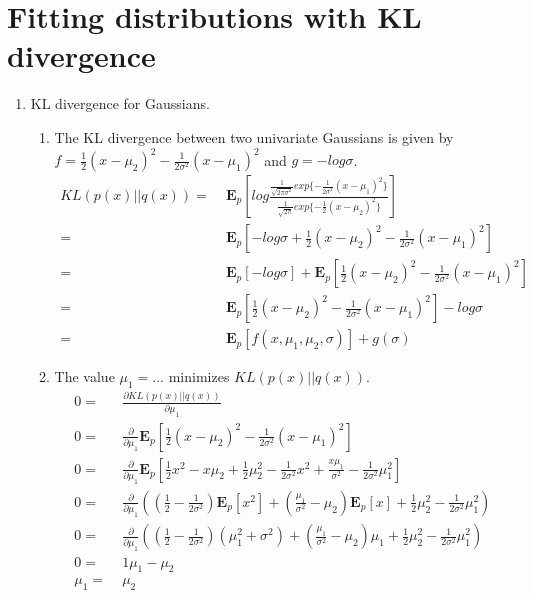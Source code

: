 \section{Fitting distributions with KL divergence}
\begin{enumerate}
\item KL divergence for Gaussians. 

\begin{enumerate}
\item The KL divergence between two univariate Gaussians is given by $f=\frac{1}{2}(x-\mu_{2})^{2}-\frac{1}{2\sigma^{2}}(x-\mu_{1})^{2}$
and $g=-log\sigma$. \begin{align*}
KL(p(x)||q(x))= & \;\mathbf{E}_{p}[log\frac{\frac{1}{\sqrt{2\pi\sigma^{2}}}exp\{-\frac{1}{2\sigma^{2}}(x-\mu_{1})^{2}\}}{\frac{1}{\sqrt{2\pi}}exp\{-\frac{1}{2}(x-\mu_{2})^{2}\}}]\\
= & \;\mathbf{E}_{p}[-log\sigma+\frac{1}{2}(x-\mu_{2})^{2}-\frac{1}{2\sigma^{2}}(x-\mu_{1})^{2}]\\
= & \;\mathbf{E}_{p}[-log\sigma]+\mathbf{E}_{p}[\frac{1}{2}(x-\mu_{2})^{2}-\frac{1}{2\sigma^{2}}(x-\mu_{1})^{2}]\\
= & \;\mathbf{E}_{p}[\frac{1}{2}(x-\mu_{2})^{2}-\frac{1}{2\sigma^{2}}(x-\mu_{1})^{2}]-log\sigma\\
= & \;\mathbf{E}_{p}[f(x,\mu_{1},\mu_{2},\sigma)]+g(\sigma)\end{align*}
 
\item The value $\mu_{1}=\ldots$ minimizes $KL(p(x)||q(x))$. \begin{align*}
0= & \;\frac{\partial KL(p(x)||q(x))}{\partial\mu_{1}}\\
0= & \;\frac{\partial}{\partial\mu_{1}}\mathbf{E}_{p}[\frac{1}{2}(x-\mu_{2})^{2}-\frac{1}{2\sigma^{2}}(x-\mu_{1})^{2}]\\
0= & \;\frac{\partial}{\partial\mu_{1}}\mathbf{E}_{p}[\frac{1}{2}x^{2}-x\mu_{2}+\frac{1}{2}\mu_{2}^{2}-\frac{1}{2\sigma^{2}}x^{2}+\frac{x\mu_{1}}{\sigma^{2}}-\frac{1}{2\sigma^{2}}\mu_{1}^{2}]\\
0= & \;\frac{\partial}{\partial\mu_{1}}((\frac{1}{2}-\frac{1}{2\sigma^{2}})\mathbf{E}_{p}[x^{2}]+(\frac{\mu_{1}}{\sigma^{2}}-\mu_{2})\mathbf{E}_{p}[x]+\frac{1}{2}\mu_{2}^{2}-\frac{1}{2\sigma^{2}}\mu_{1}^{2})\\
0= & \;\frac{\partial}{\partial\mu_{1}}((\frac{1}{2}-\frac{1}{2\sigma^{2}})(\mu_{1}^{2}+\sigma^{2})+(\frac{\mu_{1}}{\sigma^{2}}-\mu_{2})\mu_{1}+\frac{1}{2}\mu_{2}^{2}-\frac{1}{2\sigma^{2}}\mu_{1}^{2})\\
0= & \;1\mu_{1}-\mu_{2}\\
\mu_{1}= & \;\mu_{2}\end{align*}
 

\end{enumerate}
\end{enumerate}
